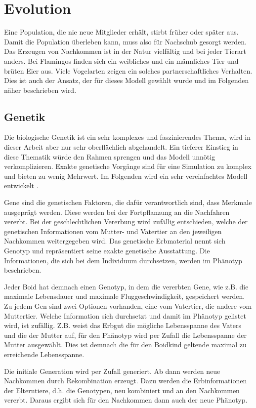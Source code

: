 \documentclass[draft=false
              ,paper=a4
              ,twoside=false
              ,fontsize=11pt
              ,headsepline
              ,BCOR10mm
              ,DIV11
              ,bibtotoc
              ,liststotoc
              ]{scrbook}
\begin{document}
\section{Evolution}
Eine Population, die nie neue Mitglieder erhält, stirbt früher oder später aus. Damit die Population überleben kann, muss also für Nachschub gesorgt werden. Das Erzeugen von Nachkommen ist in der Natur vielfältig und bei jeder Tierart anders. Bei Flamingos finden sich ein weibliches und ein männliches Tier und brüten Eier aus. Viele Vogelarten zeigen ein solches partnerschaftliches Verhalten. Dies ist auch der Ansatz, der für dieses Modell gewählt wurde und im Folgenden näher beschrieben wird.

\subsection{Genetik}
Die biologische Genetik ist ein sehr komplexes und faszinierendes Thema, wird in dieser Arbeit aber nur sehr oberflächlich abgehandelt. Ein tieferer Einstieg in diese Thematik würde den Rahmen sprengen und das Modell unnötig verkomplizieren. Exakte genetische Vorgänge sind für eine Simulation zu komplex und bieten zu wenig Mehrwert. Im Folgenden wird ein sehr vereinfachtes Modell entwickelt \cite{genetik}.

Gene sind die genetischen Faktoren, die dafür verantwortlich sind, dass Merkmale ausgeprägt werden. Diese werden bei der Fortpflanzung an die Nachfahren vererbt. Bei der geschlechtlichen Vererbung wird zufällig entschieden, welche der genetischen Informationen vom Mutter- und Vatertier an den jeweiligen Nachkommen weitergegeben wird. Das genetische Erbmaterial nennt sich Genotyp und repräsentiert seine exakte genetische Ausstattung. Die Informationen, die sich bei dem Individuum durchsetzen, werden im Phänotyp beschrieben.

Jeder Boid hat demnach einen Genotyp, in dem die vererbten Gene, wie z.B. die maximale Lebensdauer und maximale Fluggeschwindigkeit, gespeichert werden. Zu jedem Gen sind zwei Optionen vorhanden, eine vom Vatertier, die andere vom Muttertier. Welche Information sich durchsetzt und damit im Phänotyp gelistet wird, ist zufällig. Z.B. weist das Erbgut die mögliche Lebensspanne des Vaters und die der Mutter auf, für den Phänotyp wird per Zufall die Lebensspanne der Mutter ausgewählt. Dies ist demnach die für den Boidkind geltende maximal zu erreichende Lebensspanne.

Die initiale Generation wird per Zufall generiert. Ab dann werden neue Nachkommen durch Rekombination erzeugt. Dazu werden die Erbinformationen der Elterntiere, d.h. die Genotypen, neu kombiniert und an den Nachkommen vererbt. Daraus ergibt sich für den Nachkommen dann auch der neue Phänotyp.
\end{document}
